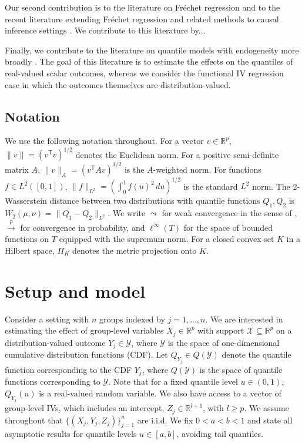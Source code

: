 \documentclass[12pt]{article}
\newcommand{\T}{\mathsf{T}} %
\newcommand{\R}{\mathbb{R}} %
\newcommand{\calP}{\mathcal{Y}} %
\newcommand{\calQ}{Q(\mathcal{Y})} %
\begin{document}
Our second contribution is to the literature on Fr\'echet regression \citep{petersen2019frechet} and to the recent literature extending  Fr\'echet regression and related methods to causal inference settings \citep[e.g.,][]{van2025regression, kurisu2025geodesic, kurisu2025geodesic, zhou2025geodesic, katta2024interpretable}. We contribute to this literature by...


Finally, we contribute to the literature on quantile models with endogeneity more broadly \citep[e.g.,][among many others]{abadie2002instrumental,chernozhukov2005iv,chernozhukov2006instrumental,chernozhukov2008instrumental,lee2007endogeneity,lee2007nonparametric,melly2013unconditional,kaplan2017smoothed,vuong2017counterfactual,decastro2019smoothed,wuthrich2019closed,wuthrich2020comparison,kaido2021decentralization,beyhum2023instrumental}. The goal of this literature is to estimate the effects on the quantiles of real-valued scalar outcomes, whereas we consider the functional IV regression case in which the outcomes themselves are distribution-valued.




\subsection{Notation}
We use the following notation throughout. For a vector $v \in \R^p$, $\|v\| = (v^{\!\T} v)^{1/2}$ denotes the Euclidean norm. For a positive semi-definite matrix $A$, $\|v\|_A = (v^{\!\T} A v)^{1/2}$ is the $A$-weighted norm. For functions $f \in L^2([0,1])$, $\|f\|_{L^2} = (\int_0^1 f(u)^2\, du)^{1/2}$ is the standard $L^2$ norm. The 2-Wasserstein distance between two distributions with quantile functions $Q_1, Q_2$ is $W_2(\mu,\nu) = \|Q_1 - Q_2\|_{L^2}$. We write $\leadsto$ for weak convergence in the sense of \citet{vaart1996weak}, $\overset{p}{\to}$ for convergence in probability, and $\ell^\infty(T)$ for the space of bounded functions on $T$ equipped with the supremum norm. For a closed convex set $K$ in a Hilbert space, $\Pi_K$ denotes the metric projection onto $K$.



\section{Setup and model}

Consider a setting with $n$ groups indexed by $j=1, \dots, n$. We are interested in estimating the effect of group-level variables $X_j \in \R^p$ with support $\mathcal{X} \subseteq \R^p$ on a distribution-valued outcome $Y_j\in \mathcal{Y}$, where $\calP$ is the space of one-dimensional cumulative distribution functions (CDF). Let $Q_{Y_j} \in \calQ$ denote the quantile function corresponding to the CDF $Y_j$, where $\calQ$ is the space of quantile functions corresponding to $\calP$. Note that for a fixed quantile level $u\in (0,1)$, $Q_{Y_j}(u)$ is a real-valued random variable. We also have access to a vector of group-level IVs, which includes an intercept, $Z_j \in \R^{l+1}$, with $l\ge p$. We assume throughout that $\{(X_j,Y_j,Z_j)\}_{j=1}^n$ are i.i.d. We fix $0 < a < b < 1$ and state all asymptotic results for quantile levels $u \in [a,b]$, avoiding tail quantiles.
\end{document}
